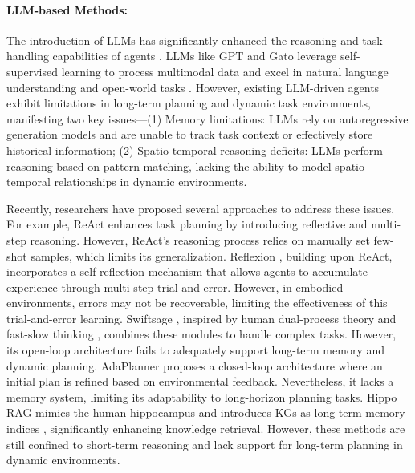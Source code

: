 \paragraph{LLM-based Methods:} The introduction of LLMs has significantly enhanced the reasoning and task-handling capabilities of agents \cite{chan2023chateval, kannan2024smart, sun2024llm}. LLMs like GPT \cite{hurst2024gpt} and Gato \cite{reed2022generalist} leverage self-supervised learning to process multimodal data and excel in natural language understanding and open-world tasks \cite{raffel2020exploring}. However, existing LLM-driven agents exhibit limitations in long-term planning and dynamic task environments, manifesting two key issues---(1) Memory limitations: LLMs rely on autoregressive generation models and are unable to track task context or effectively store historical information; (2) Spatio-temporal reasoning deficits: LLMs perform reasoning based on pattern matching, lacking the ability to model spatio-temporal relationships in dynamic environments.

Recently, researchers have proposed several approaches to address these issues. 
For example, ReAct \cite{yao2022react} enhances task planning by introducing reflective and multi-step reasoning. However, ReAct's reasoning process relies on manually set few-shot samples, which limits its generalization. Reflexion \cite{shinn2024reflexion}, building upon ReAct, incorporates a self-reflection mechanism that allows agents to accumulate experience through multi-step trial and error. However, in embodied environments, errors may not be recoverable, limiting the effectiveness of this trial-and-error learning. Swiftsage \cite{lin2024swiftsage}, inspired by human dual-process theory \cite{frankish2010dual} and fast-slow thinking \cite{kahneman2011thinking}, combines these modules to handle complex tasks. However, its open-loop architecture fails to adequately support long-term memory and dynamic planning. AdaPlanner \cite{sun2024adaplanner} proposes a closed-loop architecture where an initial plan is refined based on environmental feedback. Nevertheless, it lacks a memory system, limiting its adaptability to long-horizon planning tasks. Hippo RAG \cite{gutierrez2024hipporag} mimics the human hippocampus \cite{burgess2002human} and introduces KGs as long-term memory indices \cite{chen2020review}, significantly enhancing knowledge retrieval. However, these methods are still confined to short-term reasoning and lack support for long-term planning in dynamic environments.